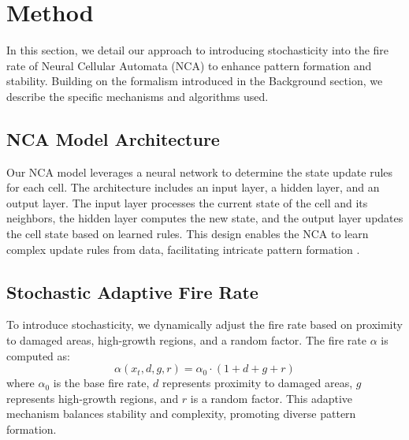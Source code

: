\documentclass{article} %
\begin{document}
\section{Method}
\label{sec:method}

In this section, we detail our approach to introducing stochasticity into the fire rate of Neural Cellular Automata (NCA) to enhance pattern formation and stability. Building on the formalism introduced in the Background section, we describe the specific mechanisms and algorithms used.

\subsection{NCA Model Architecture}
Our NCA model leverages a neural network to determine the state update rules for each cell. The architecture includes an input layer, a hidden layer, and an output layer. The input layer processes the current state of the cell and its neighbors, the hidden layer computes the new state, and the output layer updates the cell state based on learned rules. This design enables the NCA to learn complex update rules from data, facilitating intricate pattern formation \citep{lu2024aiscientist}.

\subsection{Stochastic Adaptive Fire Rate}
To introduce stochasticity, we dynamically adjust the fire rate based on proximity to damaged areas, high-growth regions, and a random factor. The fire rate \( \alpha \) is computed as:
\[
\alpha(x_t, d, g, r) = \alpha_0 \cdot (1 + d + g + r)
\]
where \( \alpha_0 \) is the base fire rate, \( d \) represents proximity to damaged areas, \( g \) represents high-growth regions, and \( r \) is a random factor. This adaptive mechanism balances stability and complexity, promoting diverse pattern formation.
\end{document}
